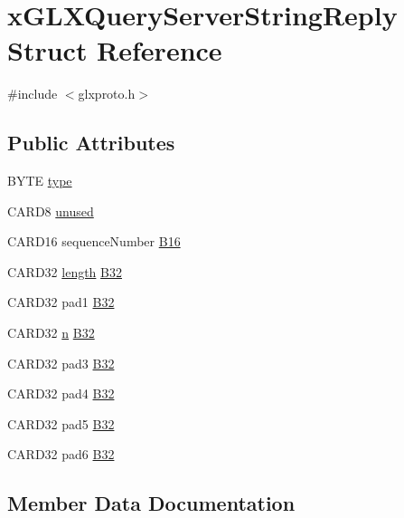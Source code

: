 \hypertarget{structx_g_l_x_query_server_string_reply}{}\section{x\+G\+L\+X\+Query\+Server\+String\+Reply Struct Reference}
\label{structx_g_l_x_query_server_string_reply}


{\ttfamily \#include $<$glxproto.\+h$>$}

\subsection*{Public Attributes}
\begin{DoxyCompactItemize}
\item 
B\+Y\+TE \hyperlink{structx_g_l_x_query_server_string_reply_a9b87be6858fb73f34ffdcb67a6457476}{type}
\item 
C\+A\+R\+D8 \hyperlink{structx_g_l_x_query_server_string_reply_a3083b3c4a46849335828bae0c3728ff0}{unused}
\item 
C\+A\+R\+D16 sequence\+Number \hyperlink{structx_g_l_x_query_server_string_reply_a898c0e7a149e0bb8a85699fb88071693}{B16}
\item 
C\+A\+R\+D32 \hyperlink{glcorearb_8h_ab9c919755bde3b34349e23a32b4e0fa7}{length} \hyperlink{structx_g_l_x_query_server_string_reply_aa13d21d9fd697ad008684f92897996f5}{B32}
\item 
C\+A\+R\+D32 pad1 \hyperlink{structx_g_l_x_query_server_string_reply_a5b09f986dc96cf0bdea8206b01c7e1e5}{B32}
\item 
C\+A\+R\+D32 \hyperlink{glcorearb_8h_ae2b4646468bc89d0ba646f5cf838e051}{n} \hyperlink{structx_g_l_x_query_server_string_reply_af628992c4238f7767f3f06fa2ebaab33}{B32}
\item 
C\+A\+R\+D32 pad3 \hyperlink{structx_g_l_x_query_server_string_reply_a731e7bef68efc98a5f84a9d3c1e15e83}{B32}
\item 
C\+A\+R\+D32 pad4 \hyperlink{structx_g_l_x_query_server_string_reply_a63ab6fe8853f27878a9539ae8b36c963}{B32}
\item 
C\+A\+R\+D32 pad5 \hyperlink{structx_g_l_x_query_server_string_reply_a8c7162b460e3c372baf781ddf8dd75f5}{B32}
\item 
C\+A\+R\+D32 pad6 \hyperlink{structx_g_l_x_query_server_string_reply_a6a667be8e5dc75d560c13de68676cdd4}{B32}
\end{DoxyCompactItemize}


\subsection{Member Data Documentation}
\mbox{\label{structx_g_l_x_query_server_string_reply_a898c0e7a149e0bb8a85699fb88071693}} 
